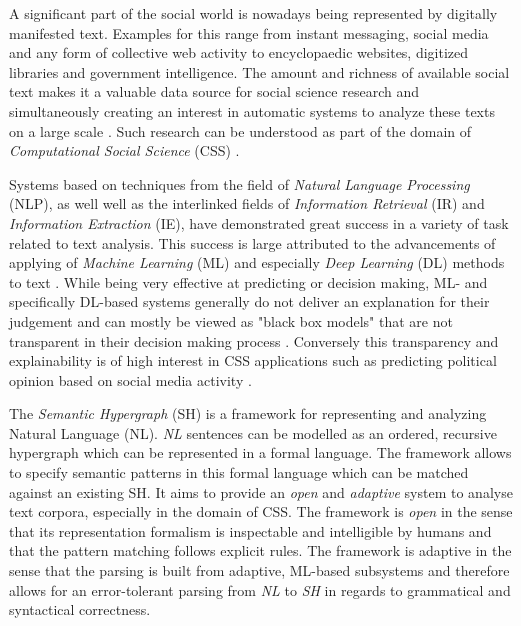 \documentclass[11pt]{scrreprt}
\let\cite\parencite  %
\begin{document}
A significant part of the social world is nowadays being represented by digitally manifested text. Examples for this range from instant messaging, social media and any form of collective web activity to encyclopaedic websites, digitized libraries and government intelligence. The amount and richness of available social text makes it a valuable data source for social science research and simultaneously creating an interest in automatic systems to analyze these texts on a large scale \cite{evansMachineTranslationMining2016}. Such research can be understood as part of the domain of \textit{Computational Social Science} (CSS) \cite{lazerComputationalSocialScience2009}.

Systems based on techniques from the field of \textit{ Natural Language Processing} (NLP), as well well as the interlinked fields of \textit{Information Retrieval} (IR) and \textit{Information Extraction} (IE), have demonstrated great success in a variety of task related to text analysis. This success is large attributed to the advancements of applying of \textit{Machine Learning} (ML) and especially \textit{Deep Learning} (DL) methods to text \cite{hirschbergAdvancesNaturalLanguage2015} \cite{qiuPretrainedModelsNatural2020}. While being very effective at predicting or decision making, ML- and specifically DL-based systems generally do not deliver an explanation for their judgement and can mostly be viewed as "black box models" that are not transparent in their decision making process \cite{rudinStopExplainingBlack2019}. Conversely this transparency and explainability is of high interest in CSS applications such as predicting political opinion based on social media activity \cite{wilkersonLargeScaleComputerizedText2017}.

The \textit{Semantic Hypergraph} (SH) \cite{menezesSemanticHypergraphs2021} is a framework for representing and analyzing Natural Language (NL). \textit{NL} sentences can be modelled as an ordered, recursive hypergraph which can be represented in a formal language. The framework allows to specify semantic patterns in this formal language which can be matched against an existing SH. It aims to provide an \textit{open} and \textit{adaptive} system to analyse text corpora, especially in the domain of CSS. The framework is \textit{open} in the sense that its representation formalism is inspectable and intelligible by humans and that the pattern matching follows explicit rules. The framework is adaptive in the sense that the parsing is built from adaptive, ML-based subsystems and therefore allows for an error-tolerant parsing from \textit{NL} to \textit{SH} in regards to grammatical and syntactical correctness.
\end{document}
